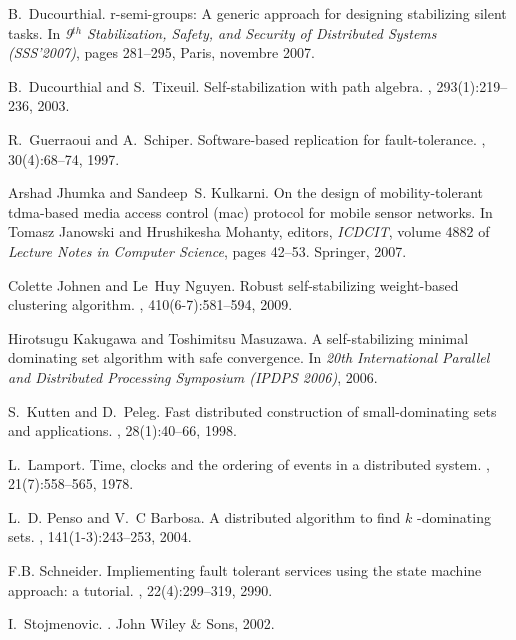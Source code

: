 \documentclass[11pt,english]{article}
\begin{document}
\begin{thebibliography}{10}
B.~Ducourthial.
\newblock r-semi-groups: A generic approach for designing stabilizing silent
  tasks.
\newblock In {\em 9$^{th}$ Stabilization, Safety, and Security of Distributed
  Systems (SSS'2007)}, pages 281--295, Paris, novembre 2007.

B.~Ducourthial and S.~Tixeuil.
\newblock Self-stabilization with path algebra.
, 293(1):219--236, 2003.

R.~Guerraoui and A.~Schiper.
\newblock Software-based replication for fault-tolerance.
, 30(4):68--74, 1997.

Arshad Jhumka and Sandeep~S. Kulkarni.
\newblock On the design of mobility-tolerant tdma-based media access control
  (mac) protocol for mobile sensor networks.
\newblock In Tomasz Janowski and Hrushikesha Mohanty, editors, {\em ICDCIT},
  volume 4882 of {\em Lecture Notes in Computer Science}, pages 42--53.
  Springer, 2007.

Colette Johnen and Le~Huy Nguyen.
\newblock Robust self-stabilizing weight-based clustering algorithm.
, 410(6-7):581--594, 2009.

Hirotsugu Kakugawa and Toshimitsu Masuzawa.
\newblock A self-stabilizing minimal dominating set algorithm with safe
  convergence.
\newblock In {\em 20th International Parallel and Distributed Processing
  Symposium (IPDPS 2006)}, 2006.

S.~Kutten and D.~Peleg.
\newblock Fast distributed construction of small-dominating sets and
  applications.
, 28(1):40--66, 1998.

L.~Lamport.
\newblock Time, clocks and the ordering of events in a distributed system.
, 21(7):558--565, 1978.

L.~D. Penso and V.~C Barbosa.
\newblock A distributed algorithm to find $k$ -dominating sets.
, 141(1-3):243--253, 2004.

F.B. Schneider.
\newblock Impliementing fault tolerant services using the state machine
  approach: a tutorial.
, 22(4):299--319, 2990.

I.~Stojmenovic.
.
\newblock John Wiley \& Sons, 2002.

\end{thebibliography}
\end{document}
